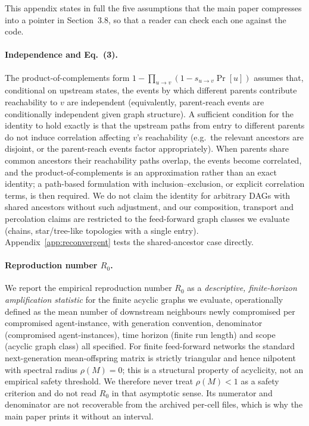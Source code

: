 \documentclass[sigconf,anonymous]{aamas}
\begin{document}
This appendix states in full the five assumptions that the main paper compresses into a
pointer in Section~3.8, so that a reader can check each one against the code.

\paragraph{Independence and Eq.~(3).} The product-of-complements form
$1-\prod_{u\to v}(1 - s_{u\to v}\Pr[u])$ assumes that, conditional on upstream states,
the events by which different parents contribute reachability to $v$ are independent
(equivalently, parent-reach events are conditionally independent given graph
structure). A sufficient condition for the identity to hold exactly is that the
upstream paths from entry to different parents do not induce correlation affecting
$v$'s reachability (e.g.\ the relevant ancestors are disjoint, or the parent-reach
events factor appropriately). When parents share common ancestors their reachability
paths overlap, the events become correlated, and the product-of-complements is an
approximation rather than an exact identity; a path-based formulation with
inclusion--exclusion, or explicit correlation terms, is then required. We do not claim
the identity for arbitrary DAGs with shared ancestors without such adjustment, and our
composition, transport and percolation claims are restricted to the feed-forward graph
classes we evaluate (chains, star/tree-like topologies with a single entry).
Appendix~\ref{app:reconvergent} tests the shared-ancestor case directly.

\paragraph{Reproduction number $R_0$.} We report the empirical reproduction number
$R_0$ as a \emph{descriptive, finite-horizon amplification statistic} for the finite
acyclic graphs we evaluate, operationally defined as the mean number of downstream
neighbours newly compromised per compromised agent-instance, with generation
convention, denominator (compromised agent-instances), time horizon (finite run length)
and scope (acyclic graph class) all specified. For finite feed-forward networks the
standard next-generation mean-offspring matrix is strictly triangular and hence
nilpotent with spectral radius $\rho(M) = 0$; this is a structural property of
acyclicity, not an empirical safety threshold. We therefore never treat $\rho(M) < 1$
as a safety criterion and do not read $R_0$ in that asymptotic sense. Its numerator and
denominator are not recoverable from the archived per-cell files, which is why the main
paper prints it without an interval.
\end{document}
